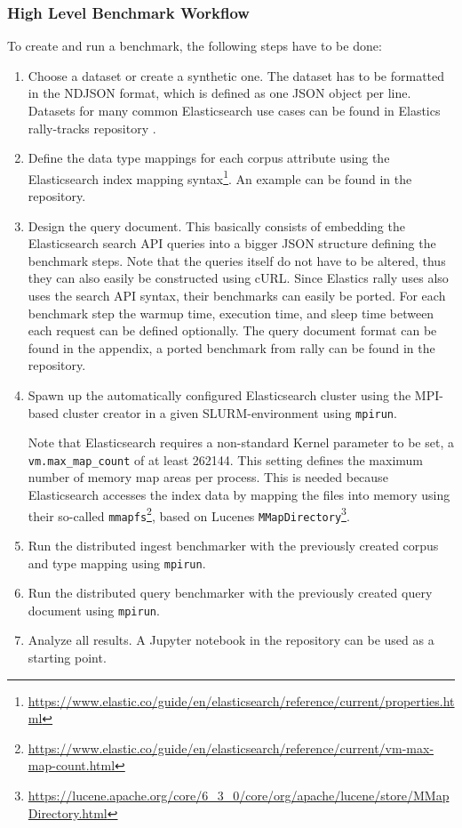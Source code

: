 \subsubsection{High Level Benchmark Workflow}
To create and run a benchmark, the following steps have to be done:
\begin{enumerate}
  \item Choose a dataset or create a synthetic one. The dataset has to be formatted in the \ac{NDJSON} format, which is defined as one JSON object per line. Datasets for many common Elasticsearch use cases can be found in Elastics rally-tracks repository \cite{rallytracks}.
  \item Define the data type mappings for each corpus attribute using the Elasticsearch index mapping syntax\footnote{\url{https://www.elastic.co/guide/en/elasticsearch/reference/current/properties.html}}. An example can be found in the repository.
  \item Design the query document. This basically consists of embedding the Elasticsearch search API queries into a bigger JSON structure defining the benchmark steps.  Note that the queries itself do not have to be altered, thus they can also easily be constructed using cURL. Since Elastics rally uses also uses the search API syntax, their benchmarks can easily be ported. For each benchmark step the warmup time, execution time, and sleep time between each request can be defined optionally. The query document format can be found in the appendix, a ported benchmark from rally can be found in the repository.
  \item Spawn up the automatically configured Elasticsearch cluster using the \ac{MPI}-based cluster creator in a given SLURM-environment using \texttt{mpirun}. 

    Note that Elasticsearch requires a non-standard Kernel parameter to be set, a \texttt{vm.max\_map\_count} of at least 262144. This setting defines the maximum number of memory map areas per process. This is needed because Elasticsearch accesses the index data by mapping the files into memory using their so-called \texttt{mmapfs}\footnote{\url{https://www.elastic.co/guide/en/elasticsearch/reference/current/vm-max-map-count.html}}, based on Lucenes \texttt{MMapDirectory}\footnote{\url{https://lucene.apache.org/core/6_3_0/core/org/apache/lucene/store/MMapDirectory.html}}.
  \item Run the distributed ingest benchmarker with the previously created corpus and type mapping using \texttt{mpirun}.
  \item Run the distributed query benchmarker with the previously created query document using \texttt{mpirun}.
  \item Analyze all results. A Jupyter notebook in the repository can be used as a starting point.
\end{enumerate}

